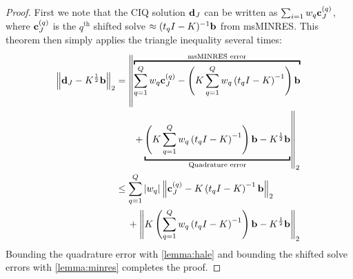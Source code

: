 \begin{proof}
  First we note that the CIQ solution $\mathbf{d}_J$ can be written as $\sum_{i=1} w_q \mathbf{c}^{(q)}_J$, where $\mathbf{c}^{(q)}_J$ is the $q^\text{th}$ shifted solve $\approx (t_q I - K)^{-1} \mathbf{b}$ from msMINRES.
  This theorem then simply applies the triangle inequality several times:
  \begin{align*}
    \left\Vert \bd_J - \bK^{\frac 1 2} \bb \right\Vert_2
    &=
    \left\Vert \overbracket{\sum_{q=1}^Q w_q \bc^{(q)}_J - \left( \bK \sum_{q=1}^Q w_q \left( t_q \bI - \bK \right)^{-1} \right) \bb }^{\text{msMINRES error}} \right.
    \\
    &\phantom{=} \quad \left. + \underbracket{\left( \bK \sum_{q=1}^Q w_q \left( t_q \bI - \bK \right)^{-1} \right) \bb - \bK^{\frac 1 2} \bb}_{\text{Quadrature error}} \right\Vert_2
    \\
    &\leq \sum_{q=1}^Q \vert w_q \vert \left\Vert \bc^{(q)}_J - \bK \left( t_q \bI - \bK \right)^{-1} \bb \right\Vert_2
    \\
    &\phantom{=} \:\: + \left\Vert \bK \left( \sum_{q=1}^Q w_q \left( t_q \bI - \bK \right)^{-1} \right) \bb - \bK^{\frac 1 2} \bb \right\Vert_2
  \end{align*}
  Bounding the quadrature error with \cref{lemma:hale} and bounding the shifted solve errors with \cref{lemma:minres} completes the proof.
\end{proof}
